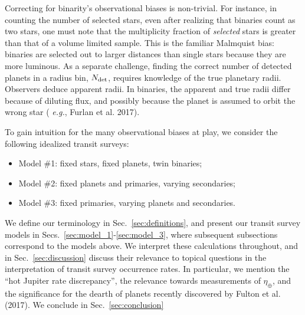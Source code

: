 Correcting for binarity's observational biases is non-trivial.
For instance, in counting the number of selected stars, even after realizing 
that binaries count as two stars, one must note that the multiplicity 
fraction of {\it selected} stars is greater than that of a volume limited 
sample.
This is the familiar Malmquist bias: binaries are selected out to larger 
distances than single stars because they are more luminous.
As a separate challenge, finding the correct number of detected planets in a 
radius bin, $N_{\rm det}$, requires knowledge of the true planetary radii.
Observers deduce apparent radii.
In binaries, the apparent and true radii differ because of diluting flux, 
and possibly because the planet is assumed to orbit the wrong star ({\it 
e.g.}, Furlan et al. 2017).

To gain intuition for the many observational biases at play,
we consider the following idealized transit surveys:
\begin{itemize}
    \item Model \#1: fixed stars, fixed planets, twin binaries;
    \item Model \#2: fixed planets and primaries, varying secondaries;
    \item Model \#3: fixed primaries, varying planets and secondaries.
\end{itemize}
We define our terminology in Sec.~\ref{sec:definitions}, and present
our transit survey models in Secs.~\ref{sec:model_1}-\ref{sec:model_3}, where 
subsequent subsections correspond to the models above.
We interpret these calculations throughout, and in 
Sec.~\ref{sec:discussion} discuss their relevance to topical questions in 
the interpretation of transit survey occurrence rates.
In particular, we mention the ``hot Jupiter rate discrepancy'', the relevance 
towards measurements of $\eta_\oplus$, and the significance for the dearth of 
planets recently discovered by Fulton et al. (2017).
We conclude in Sec.~\ref{sec:conclusion}